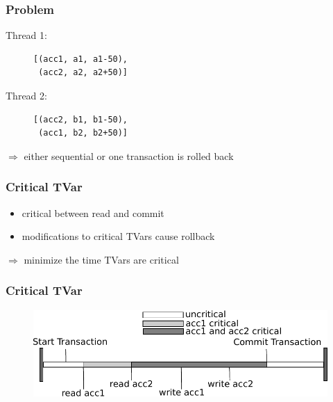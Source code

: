 \documentclass{beamer}
\begin{document}
\begin{frame}[fragile]
    \frametitle{Problem}
    \fboxsep=0pt
    \noindent
    \begin{minipage}[t]{0.48\linewidth}
      Thread 1:
    \begin{figure}
     \begin{lstlisting}[frame=single]
[(acc1, a1, a1-50),
 (acc2, a2, a2+50)]
     \end{lstlisting}
    \end{figure}
    \end{minipage}%
    \hfill%
    \begin{minipage}[t]{0.48\linewidth}
      Thread 2:
    \begin{figure}
     \begin{lstlisting}[frame=single]
[(acc2, b1, b1-50),
 (acc1, b2, b2+50)]
     \end{lstlisting}
    \end{figure}
    \end{minipage}
    \vfill
    \pause
    $\Rightarrow$ either sequential or one transaction is rolled back
\end{frame}


\begin{frame}
 \frametitle{Critical TVar}
   \begin{itemize}\setlength\itemsep{1em}
    \item critical between read and commit
    \item modifications to critical TVars cause rollback
   \end{itemize}
   \pause
   \vfill
   $\Rightarrow$ minimize the time TVars are critical 
\end{frame}


  
  \begin{frame}
   \frametitle{Critical TVar}
   \begin{figure}
    \includegraphics[scale=0.7]{ressources/CriticalValue.pdf}
   \end{figure}
   \end{frame}
\end{document}

